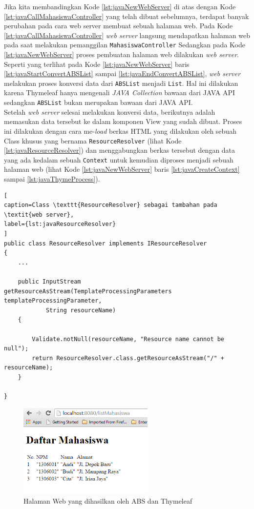 Jika kita membandingkan Kode \ref{lst:javaNewWebServer} di atas dengan Kode \ref{lst:javaCallMahasiswaController} yang telah dibuat sebelumnya, terdapat banyak perubahan pada cara web server membuat sebuah halaman web. Pada Kode \ref{lst:javaCallMahasiswaController} \textit{web server} langsung mendapatkan halaman web pada saat melakukan pemanggilan \texttt{MahasiswaController} Sedangkan pada Kode \ref{lst:javaNewWebServer} proses pembuatan halaman web dilakukan \textit{web server}. Seperti yang terlihat pada Kode \ref{lst:javaNewWebServer} baris \ref{lst:javaStartConvertABSList} sampai \ref{lst:javaEndConvertABSList}, \textit{web server} melakukan proses konversi data dari \texttt{ABSList} menjadi \texttt{List}. Hal ini dilakukan karena Thymeleaf hanya mengenali \textit{JAVA Collection} bawaan dari JAVA API sedangkan \texttt{ABSList} bukan merupakan bawaan dari JAVA API.\\

Setelah \textit{web server} selesai melakukan konversi data, berikutnya adalah memasukan data tersebut ke dalam komponen View yang sudah dibuat. Proses ini dilakukan dengan cara me-\textit{load} berkas HTML yang dilakukan oleh sebuah Class khusus yang bernama \texttt{ResourceResolver} (lihat Kode \ref{lst:javaResourceResolver}) dan menggabungkan berkas tersebut dengan data yang ada kedalam sebuah \texttt{Context} untuk kemudian diproses menjadi sebuah halaman web (lihat Kode \ref{lst:javaNewWebServer} baris \ref{lst:javaCreateContext} sampai \ref{lst:javaThymeProcess}).

\begin{lstlisting}[
caption=Class \texttt{ResourceResolver} sebagai tambahan pada \textit{web server},
label={lst:javaResourceResolver}
]
public class ResourceResolver implements IResourceResolver
{
	...
	
	public InputStream getResourceAsStream(TemplateProcessingParameters templateProcessingParameter,
			String resourceName) 
	{
		
		Validate.notNull(resourceName, "Resource name cannot be null");
		return ResourceResolver.class.getResourceAsStream("/" + resourceName);
	}

}
\end{lstlisting}

\begin{figure}
    \centering
    \includegraphics[width=0.6\textwidth]{img/hasil-list-mhs_new.png}
    \caption{Halaman Web yang dihasilkan oleh ABS dan Thymeleaf}
    \label{fig:listMhsThymeleaf}
\end{figure}

